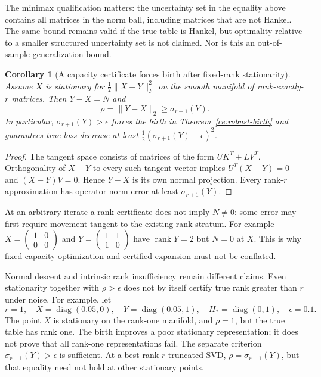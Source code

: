 \documentclass[11pt]{article}
\newtheorem{corollary}[theorem]{Corollary}
\theoremstyle{definition}
\theoremstyle{remark}
\begin{document}
The minimax qualification matters: the uncertainty set in the equality above
contains all matrices in the norm ball, including matrices that are not
Hankel. The same bound remains valid if the true table is Hankel, but
optimality relative to a smaller structured uncertainty set is not claimed.
Nor is this an out-of-sample generalization bound.

\begin{corollary}[A capacity certificate forces birth after fixed-rank stationarity]
\label{ce:stationary-birth}
Assume $X$ is stationary for
$\frac12\|X-Y\|_F^2$ on the smooth manifold of rank-exactly-$r$ matrices.
Then $Y-X=N$ and
\[
 \rho=\|Y-X\|_2\geq\sigma_{r+1}(Y).
\]
In particular, $\sigma_{r+1}(Y)>\epsilon$ forces the birth in
Theorem~\ref{ce:robust-birth} and guarantees true loss decrease at least
$\frac12(\sigma_{r+1}(Y)-\epsilon)^2$.
\end{corollary}
\begin{proof}
The tangent space consists of matrices of the form $UK^T+LV^T$.
Orthogonality of $X-Y$ to every such tangent vector implies
$U^T(X-Y)=0$ and $(X-Y)V=0$. Hence $Y-X$ is its own normal projection.
Every rank-$r$ approximation has operator-norm error at least
$\sigma_{r+1}(Y)$.
\end{proof}

At an arbitrary iterate a rank certificate does not imply $N\ne0$:
some error may first require movement tangent to the existing rank stratum.
For example $X=\left(\begin{smallmatrix}1&0\\0&0\end{smallmatrix}\right)$
and $Y=\left(\begin{smallmatrix}1&1\\1&0\end{smallmatrix}\right)$ have
$\operatorname{rank}Y=2$ but $N=0$ at $X$. This is why fixed-capacity
optimization and certified expansion must not be conflated.


Normal descent and intrinsic rank insufficiency remain different claims.
Even stationarity together with $\rho>\epsilon$ does not by itself certify
true rank greater than $r$ under noise. For example, let
\[
 r=1,\quad X=\operatorname{diag}(0.05,0),\quad
 Y=\operatorname{diag}(0.05,1),\quad
 H_*=\operatorname{diag}(0,1),\quad\epsilon=0.1.
\]
The point $X$ is stationary on the rank-one manifold, and $\rho=1$,
but the true table has rank one. The birth improves a poor stationary
representation; it does not prove that all rank-one representations fail.
The separate criterion $\sigma_{r+1}(Y)>\epsilon$ is sufficient.
At a best rank-$r$ truncated SVD, $\rho=\sigma_{r+1}(Y)$, but that
equality need not hold at other stationary points.
\end{document}
